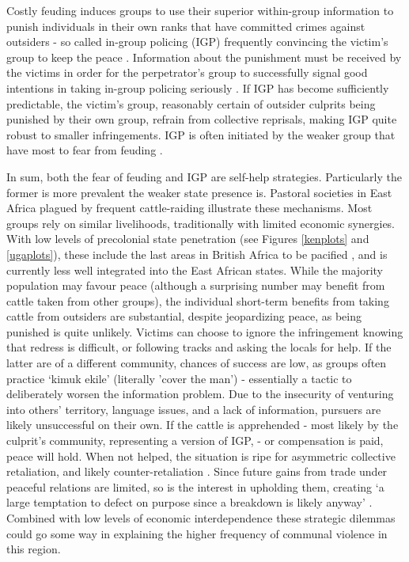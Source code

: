 Costly feuding induces groups to use their superior within-group information to
punish individuals in their own ranks that have committed crimes against
outsiders - so called in-group policing (IGP) frequently convincing the victim's
group to keep the peace \citep[723]{Fearon_1996}. Information about the
punishment must be received by the victims in order for the perpetrator's group
to successfully signal good intentions in taking in-group policing seriously
\citep{Fearon_1996}. If IGP has become sufficiently predictable, the victim’s
group, reasonably certain of outsider culprits being punished by their own
group, refrain from collective reprisals, making IGP quite robust to smaller
infringements. IGP is often initiated by the weaker group that have most to fear
from feuding \citep[50]{Lake_1996}. 

In sum, both the fear of feuding and IGP are self-help strategies. Particularly
the former is more prevalent the weaker state presence is. Pastoral societies in
East Africa plagued by frequent cattle-raiding illustrate these mechanisms. Most
groups rely on similar livelihoods, traditionally with limited economic
synergies. With low levels of precolonial state penetration (see Figures
\ref{kenplots} and \ref{ugaplots}), these include the last areas in British
Africa to be pacified \citep{Lamphear1992}, and is currently less well
integrated into the East African states. While the majority population may
favour peace (although a surprising number may benefit from cattle taken from
other groups), the individual short-term benefits from taking cattle from
outsiders are substantial, despite jeopardizing peace, as being punished is
quite unlikely. Victims can choose to ignore the infringement knowing that
redress is difficult, or following tracks and asking the locals for help. If the
latter are of a different community, chances of success are low, as groups often
practice `kimuk ekile' (literally 'cover the man') - essentially a tactic to
deliberately worsen the information problem. Due to the insecurity of venturing
into others’ territory, language issues, and a lack of information, pursuers are
likely unsuccessful on their own. If the cattle is apprehended - most likely by
the culprit's community, representing a version of IGP, - or compensation is
paid, peace will hold. When not helped, the situation is ripe for asymmetric
collective retaliation, and likely counter-retaliation
\citep[104ff]{Eaton_2008}. Since future gains from trade under peaceful
relations are limited, so is the interest in upholding them, creating ‘a large
temptation to defect on purpose since a breakdown is likely anyway’
\citep[724]{Fearon_1996}. Combined with low levels of economic interdependence
these strategic dilemmas could go some way in explaining the higher frequency of
communal violence in this region. 




